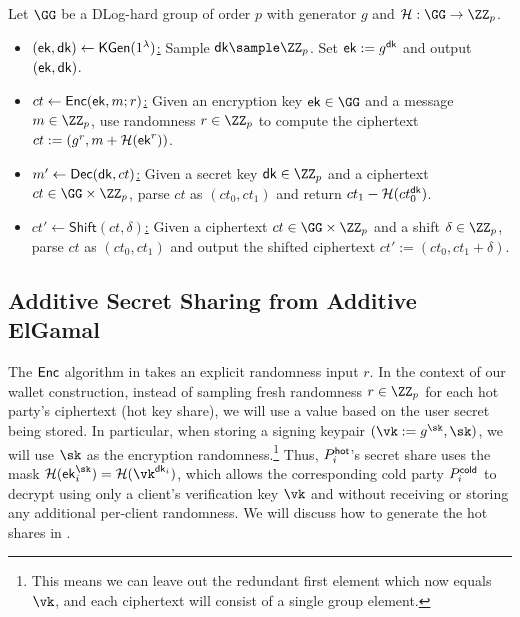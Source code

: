 \begin{construction}\label{con:additive_elgamal}
Let $\GG$ be a DLog-hard group of order $p$ with generator $g$ and $\lhlhash: \GG \rightarrow \ZZ_p$. 
\begin{itemize}
\item \underline{$(\mathsf{ek}, \mathsf{dk}) \gets {\mathsf{KGen}}(1^\lambda)$:}
Sample $\dk \sample \ZZ_p$. Set $\mathsf{ek} := g^{\mathsf{dk}}$ and output $(\mathsf{ek}, \mathsf{dk})$.

\item \underline{$ct \gets {\mathsf{Enc}}(\mathsf{ek}, m; r)$:}
Given an encryption key $\ek \in \GG$ and a message $m \in \ZZ_p$, use randomness $r \in \ZZ_p$ to compute the ciphertext $ct := (g^r, m + \mathcal{H}(\mathsf{ek}^r))$.

\item \underline{$m' \gets {\mathsf{Dec}}(\mathsf{dk}, ct)$:}
Given a secret key $\dk \in \ZZ_p$ and a ciphertext $ct \in \GG \times\ZZ_p$, parse $ct$ as $(ct_0, ct_1)$ and return $ct_1 - \mathcal{H}(ct_0^{\mathsf{dk}})$.

\item \underline{$ct' \gets \mathsf{Shift}(ct, \delta)$:}
Given a ciphertext $ct \in \GG \times \ZZ_p$ and a shift $\delta \in \ZZ_p$, parse $ct$ as $(ct_0, ct_1)$ and output the shifted ciphertext $ct' := (ct_0, ct_1 + \delta)$.
\end{itemize}
\end{construction}

\subsection{Additive Secret Sharing from Additive ElGamal}\label{sec:enc-lhl}

The ${\mathsf{Enc}}$ algorithm in  takes an explicit randomness input $r$. In the context of our wallet construction, instead of sampling fresh randomness $r \in \ZZ_p$ for each hot party's ciphertext (hot key share), we will use a value based on the user secret being stored. In particular, when storing a signing keypair $(\vk := g^{\sk}, \sk)$, we will use $\sk$ as the encryption randomness.\footnote{This means we can leave out the redundant first element which now equals $\vk$, and each ciphertext will consist of a single group element.} Thus, $P_i^{\mathsf{hot}}$'s secret share uses the mask $\lhlhash(\ek_i^{\sk}) = \lhlhash(\vk^{\dk_i})$, which allows the corresponding cold party $P_i^{\mathsf{cold}}$ to decrypt using only a client's verification key $\vk$ and without receiving or storing any additional per-client randomness. We will discuss how to generate the hot shares in .

